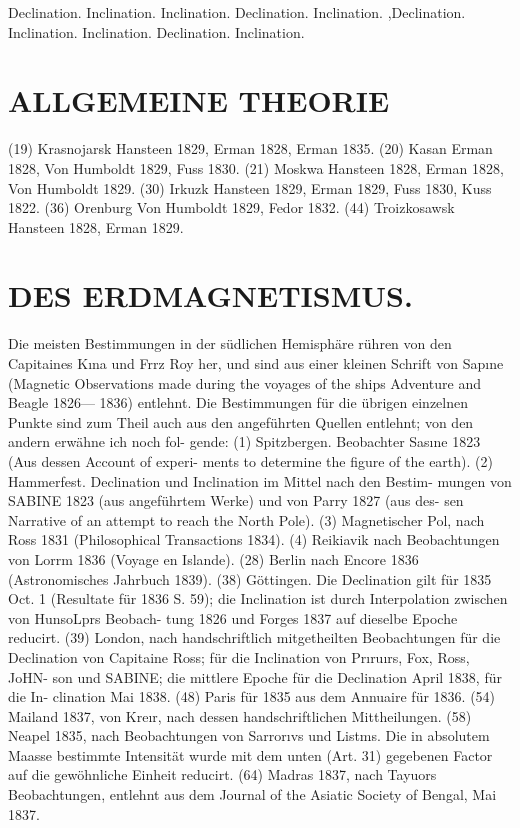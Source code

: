\documentclass[12pt,a4paper]{article}
\begin{document}
\newpage


Declination. Inclination. Inclination. Declination. Inclination. ,Declination. Inclination. Inclination. Declination. Inclination.

\section*{ALLGEMEINE THEORIE}
(19) Krasnojarsk Hansteen 1829, Erman 1828, Erman 1835.
(20) Kasan Erman 1828, Von Humboldt 1829, Fuss 1830.
(21) Moskwa Hansteen 1828, Erman 1828, Von Humboldt 1829.
(30) Irkuzk Hansteen 1829, Erman 1829, Fuss 1830, Kuss 1822.
(36) Orenburg Von Humboldt 1829, Fedor 1832.
(44) Troizkosawsk Hansteen 1828, Erman 1829.


\newpage


\section*{DES ERDMAGNETISMUS.}
Die meisten Bestimmungen in der südlichen Hemisphäre rühren von den Capitaines K\i{}na und Frrz Roy her, und sind aus einer kleinen Schrift von Sap\i{}ne (Magnetic Observations made during the voyages of the ships Adventure and Beagle 1826--- 1836) entlehnt. Die Bestimmungen für die übrigen einzelnen Punkte sind zum Theil auch aus den angeführten Quellen entlehnt; von den andern erwähne ich noch fol- gende: (1) Spitzbergen. Beobachter Sas\i{}ne 1823 (Aus dessen Account of experi- ments to determine the figure of the earth). (2) Hammerfest. Declination und Inclination im Mittel nach den Bestim- mungen von SABINE 1823 (aus angeführtem Werke) und von Parry 1827 (aus des- sen Narrative of an attempt to reach the North Pole). (3) Magnetischer Pol, nach Ross 1831 (Philosophical Transactions 1834). (4) Reikiavik nach Beobachtungen von Lorrm 1836 (Voyage en Islande). (28) Berlin nach Encore 1836 (Astronomisches Jahrbuch 1839). (38) Göttingen. Die Declination gilt für 1835 Oct. 1 (Resultate für 1836 S. 59); die Inclination ist durch Interpolation zwischen von HunsoLprs Beobach- tung 1826 und Forges 1837 auf dieselbe Epoche reducirt. (39) London, nach handschriftlich mitgetheilten Beobachtungen für die Declination von Capitaine Ross; für die Inclination von Pr\i{}ru\i{}rs, Fox, Ross, JoHN- son und SABINE; die mittlere Epoche für die Declination April 1838, für die In- clination Mai 1838. (48) Paris für 1835 aus dem Annuaire für 1836. (54) Mailand 1837, von Kre\i{}r, nach dessen handschriftlichen Mittheilungen. (58) Neapel 1835, nach Beobachtungen von Sarror\i{}vs und Listms. Die in absolutem Maasse bestimmte Intensität wurde mit dem unten (Art. 31) gegebenen Factor auf die gewöhnliche Einheit reducirt. (64) Madras 1837, nach Tayuors Beobachtungen, entlehnt aus dem Journal of the Asiatic Society of Bengal, Mai 1837.
\end{document}

